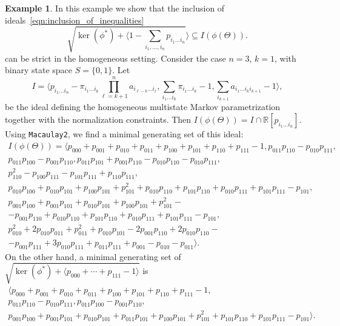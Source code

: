 \documentclass[11pt, a4paper]{article}
\numberwithin{equation}{section}
\theoremstyle{plain}
\theoremstyle{definition}
\newtheorem{example}{Example}
\begin{document}
\begin{example} \label{example:strict_inclusion_homogeneous} 
In this example we show that the inclusion of ideals~\eqref{eqn:inclusion_of_inequalities} 
\[
\sqrt{\ker (\phi^*)+\langle 1-\sum_{i_1,\ldots, i_n}p_{i_1\ldots i_n}}\rangle\subseteq I(\phi(\Theta)).
\]
can be strict in the homogeneous setting.
Consider the case $n=3$, $k=1$, with binary state space $S=\{0,1\}$.
Let
\[
I = \langle p_{i_1\ldots i_n} - 
\pi_{i_1\ldots i_k}\prod_{\ell=k+1}^n a_{i_{\ell-k}\ldots i_{\ell}}, \sum_{i_1\ldots i_k} \pi_{i_1\ldots i_k}-1, \sum_{i_{k+1}}a_{i_{1}\ldots i_k i_{k+1}}-1\rangle,
\]
be the ideal defining the homogeneous multistate Markov parametrization together with the normalization
constraints. Then 
 $I(\phi(\Theta)) = I \cap \mathbb{R}[p_{i_1\ldots i_n}]$.  Using \texttt{Macaulay2}, we find a minimal generating set 
 of this ideal:
 \begin{equation*}
 \begin{gathered}
 I(\phi(\Theta)) = \langle p_{000}+p_{001}+p_{010}+p_{011}+p_{100}+p_{101}+p_{110}+p_{111}-1,
 p_{011}p_{110}-p_{010}p_{111},\\ p_{011}p_{100}-p_{001}p_{110},
p_{011}p_{101}+p_{001}p_{110}-p_{010}p_{110}-p_{010}p_{111},\\
 p_{110}^2-p_{100}p_{111}-p_{101}p_{111}+p_{110}p_{111},\\
p_{010}p_{100}+p_{010}p_{101}+p_{100}p_{101}+p_{101}^2+p_{010}p_{110}+p_{101}p_{110}+p_{010}p_{111}+p_{101}p_{111}-p_{101},\\ p_{001}p_{100}+p_{001}p_{101}+p_{010}p_{101}+p_{100}p_{101}+p_{101}^2-\\-p_{001}p_{110}+p_{010}p_{110}+p_{101}p_{110}+p_{010}p_{111}+p_{101}p_{111}-p_{101},\\
p_{010}^2+2p_{010}p_{011}+p_{011}^2+p_{010}p_{101}-2p_{001}p_{110}+2p_{010}p_{110}-\\-p_{001}p_{111}+3p_{010}p_{111}+p_{011}p_{111}+p_{001}-p_{010}-p_{011}  
 \rangle.
 \end{gathered}
  \end{equation*}
On the other hand, a minimal generating set 
of $\sqrt{\ker(\phi^*)+\langle p_{000}+\cdots+p_{111}-1\rangle}$ is
\begin{equation*}
    \begin{gathered}
        \langle p_{000}+p_{001}+p_{010}+p_{011}+p_{100}+p_{101}+p_{110}+p_{111}-1,\\
        p_{011}p_{110}-p_{010}p_{111}, p_{011}p_{100}-p_{001}p_{110},\\ p_{001}p_{100}+p_{001}p_{101}+p_{010}p_{101}+p_{011}p_{101}+p_{100}p_{101}+p_{101}^2+p_{101}p_{110}+p_{101}p_{111}-p_{101}
     \rangle.
    \end{gathered}
\end{equation*}




\end{example}
\end{document}
